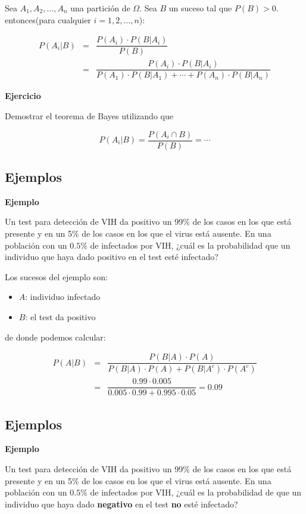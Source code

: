 \documentclass[]{book}
\providecommand{\tightlist}{%
  \setlength{\itemsep}{0pt}\setlength{\parskip}{0pt}}
\begin{document}
Sea \(A_1,A_2,\ldots,A_n\) una partición de \(\Omega\). Sea \(B\) un suceso tal que \(P(B)>0\). entonces(para cualquier \(i=1,2,\ldots,n\)):

\begin{eqnarray*}
P(A_i|B) & =& \dfrac{P(A_i)\cdot P(B|A_i)}{P(B)}\\
& =& \dfrac{P(A_i)\cdot P(B|A_i)}{P(A_1)\cdot P(B|A_1)+\cdots+P(A_n)\cdot P(B|A_n)}
\end{eqnarray*}

\textbf{Ejercicio}

Demostrar el teorema de Bayes utilizando que

\[P(A_i|B) =\dfrac{P(A_i\cap B)}{P(B)}=\cdots\]

\hypertarget{ejemplos-6}{%
\subsection{Ejemplos}\label{ejemplos-6}}

\textbf{Ejemplo}

Un test para detección de VIH da positivo un 99\% de los casos en los que está presente y en un 5\% de los casos en los que el virus está ausente. En una población con un \(0.5\%\) de infectados por VIH, ¿cuál es la probabilidad que un individuo que haya dado positivo en el test esté infectado?

Los sucesos del ejemplo son:

\begin{itemize}
\tightlist
\item
  \(A\): individuo infectado
\item
  \(B\): el test da positivo
\end{itemize}

de donde podemos calcular:

\begin{eqnarray*}
P(A|B) & =& \dfrac{P(B|A)\cdot P(A)}{P(B|A)\cdot P(A)+P(B|A^c)\cdot P(A^c)}\\
&=&\dfrac{0.99\cdot 0.005}{0.005\cdot 0.99+0.995\cdot 0.05}=0.09
\end{eqnarray*}

\hypertarget{ejemplos-7}{%
\subsection{Ejemplos}\label{ejemplos-7}}

\textbf{Ejemplo}

Un test para detección de VIH da positivo un 99\% de los casos en los que está presente y en un 5\% de los casos en los que el virus está ausente. En una población con un \(0.5\%\) de infectados por VIH, ¿cuál es la probabilidad de que un individuo que haya dado \textbf{negativo} en el test \textbf{no} esté infectado?
\end{document}

